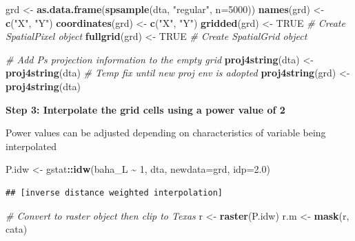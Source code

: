\documentclass[
]{book}
\newenvironment{Shaded}{\begin{snugshade}}{\end{snugshade}}
\newcommand{\AttributeTok}[1]{\textcolor[rgb]{0.13,0.29,0.53}{#1}}
\newcommand{\CommentTok}[1]{\textcolor[rgb]{0.56,0.35,0.01}{\textit{#1}}}
\newcommand{\ConstantTok}[1]{\textcolor[rgb]{0.56,0.35,0.01}{#1}}
\newcommand{\DecValTok}[1]{\textcolor[rgb]{0.00,0.00,0.81}{#1}}
\newcommand{\FloatTok}[1]{\textcolor[rgb]{0.00,0.00,0.81}{#1}}
\newcommand{\FunctionTok}[1]{\textcolor[rgb]{0.13,0.29,0.53}{\textbf{#1}}}
\newcommand{\NormalTok}[1]{#1}
\newcommand{\OtherTok}[1]{\textcolor[rgb]{0.56,0.35,0.01}{#1}}
\newcommand{\SpecialCharTok}[1]{\textcolor[rgb]{0.81,0.36,0.00}{\textbf{#1}}}
\newcommand{\StringTok}[1]{\textcolor[rgb]{0.31,0.60,0.02}{#1}}
\begin{document}
\begin{Shaded}
\begin{Highlighting}[]
\NormalTok{grd              }\OtherTok{\textless{}{-}} \FunctionTok{as.data.frame}\NormalTok{(}\FunctionTok{spsample}\NormalTok{(dta, }\StringTok{"regular"}\NormalTok{, }\AttributeTok{n=}\DecValTok{5000}\NormalTok{))}
\FunctionTok{names}\NormalTok{(grd)       }\OtherTok{\textless{}{-}} \FunctionTok{c}\NormalTok{(}\StringTok{"X"}\NormalTok{, }\StringTok{"Y"}\NormalTok{)}
\FunctionTok{coordinates}\NormalTok{(grd) }\OtherTok{\textless{}{-}} \FunctionTok{c}\NormalTok{(}\StringTok{"X"}\NormalTok{, }\StringTok{"Y"}\NormalTok{)}
\FunctionTok{gridded}\NormalTok{(grd)     }\OtherTok{\textless{}{-}} \ConstantTok{TRUE}  \CommentTok{\# Create SpatialPixel object}
\FunctionTok{fullgrid}\NormalTok{(grd)    }\OtherTok{\textless{}{-}} \ConstantTok{TRUE}  \CommentTok{\# Create SpatialGrid object}

\CommentTok{\# Add P\textquotesingle{}s projection information to the empty grid}
\FunctionTok{proj4string}\NormalTok{(dta) }\OtherTok{\textless{}{-}} \FunctionTok{proj4string}\NormalTok{(dta) }\CommentTok{\# Temp fix until new proj env is adopted}
\FunctionTok{proj4string}\NormalTok{(grd) }\OtherTok{\textless{}{-}} \FunctionTok{proj4string}\NormalTok{(dta)}
\end{Highlighting}
\end{Shaded}

\textbf{Step 3: Interpolate the grid cells using a power value of 2}

Power values can be adjusted depending on characteristics of variable being interpolated

\begin{Shaded}
\begin{Highlighting}[]
\NormalTok{P.idw }\OtherTok{\textless{}{-}}\NormalTok{ gstat}\SpecialCharTok{::}\FunctionTok{idw}\NormalTok{(baha\_L }\SpecialCharTok{\textasciitilde{}} \DecValTok{1}\NormalTok{, dta, }\AttributeTok{newdata=}\NormalTok{grd, }\AttributeTok{idp=}\FloatTok{2.0}\NormalTok{)}
\end{Highlighting}
\end{Shaded}

\begin{verbatim}
## [inverse distance weighted interpolation]
\end{verbatim}

\begin{Shaded}
\begin{Highlighting}[]
\CommentTok{\# Convert to raster object then clip to Texas}
\NormalTok{r       }\OtherTok{\textless{}{-}} \FunctionTok{raster}\NormalTok{(P.idw)}
\NormalTok{r.m     }\OtherTok{\textless{}{-}} \FunctionTok{mask}\NormalTok{(r, cata)}
\end{Highlighting}
\end{Shaded}
\end{document}
